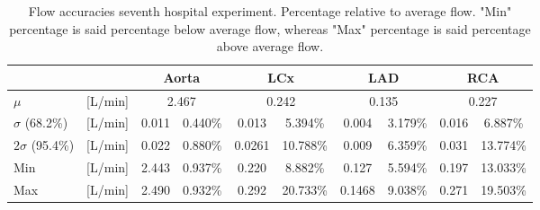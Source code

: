 \begin{table}[H]
\caption{Flow accuracies seventh hospital experiment. Percentage relative to average flow. "Min" percentage is said percentage below average flow, whereas "Max" percentage is said percentage above average flow.}
\label{tab:hospital_seven}
\begin{adjustwidth}{-0.25cm}{0cm}
\begin{tabular}{ll|cccccccc|}
                   &             & \multicolumn{2}{c}{Aorta} & \multicolumn{2}{c}{LCx}   & \multicolumn{2}{c}{LAD}   & \multicolumn{2}{c}{RCA}   \\ \hline
$\mu$              & {[}L/min{]} & \multicolumn{2}{c}{2.467} & \multicolumn{2}{c}{0.242} & \multicolumn{2}{c}{0.135} & \multicolumn{2}{c|}{0.227} \\
$\sigma$ (68.2\%)  & {[}L/min{]} & 0.011     & 0.440\%       & 0.013      & 5.394\%      & 0.004      & 3.179\%      & 0.016    & 6.887\%      \\
$2\sigma$ (95.4\%) & {[}L/min{]} & 0.022     & 0.880\%     & 0.0261     & 10.788\%     & 0.009      & 6.359\%      & 0.031      & 13.774\%     \\
Min                & {[}L/min{]} & 2.443     & 0.937\%      & 0.220      & 8.882\%     & 0.127      & 5.594\%     & 0.197      & 13.033\%    \\
Max                & {[}L/min{]} & 2.490     & 0.932\%      & 0.292      & 20.733\%    & 0.1468     & 9.038\%     & 0.271      & 19.503\%   \\ \cline{3-10}
\end{tabular}
\end{adjustwidth}
\end{table}

